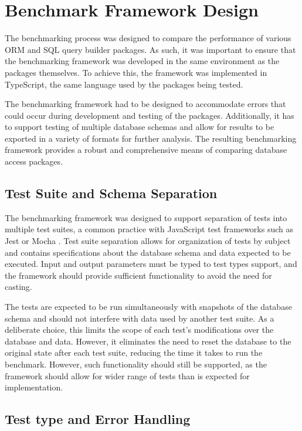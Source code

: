\chapter{Benchmark Framework Design}

The benchmarking process was designed to compare the performance of various ORM
and SQL query builder packages. As such, it was important to ensure that the
benchmarking framework was developed in the same environment as the packages
themselves. To achieve this, the framework was implemented in TypeScript, the
same language used by the packages being tested.

The benchmarking framework had to be designed to accommodate errors that could
occur during development and testing of the packages. Additionally, it has to
support testing of multiple database schemas and allow for results to be
exported in a variety of formats for further analysis. The resulting
benchmarking framework provides a robust and comprehensive means of comparing
database access packages.

\section{Test Suite and Schema Separation}

The benchmarking framework was designed to support separation of tests into
multiple test suites, a common practice with JavaScript test frameworks such as
Jest \cite{Jest} or Mocha \cite{Mocha}. Test suite separation allows for
organization of tests by subject and contains specifications about the database
schema and data expected to be executed. Input and output parameters must be
typed to test types support, and the framework should provide sufficient
functionality to avoid the need for casting.

The tests are expected to be run simultaneously with snapshots of the database
schema and should not interfere with data used by another test suite. As a
deliberate choice, this limits the scope of each test's modifications over the
database and data. However, it eliminates the need to reset the database to the
original state after each test suite, reducing the time it takes to run the
benchmark. However, such functionality should still be supported, as the
framework should allow for wider range of tests than is expected for
implementation.

\section{Test type and Error Handling}

